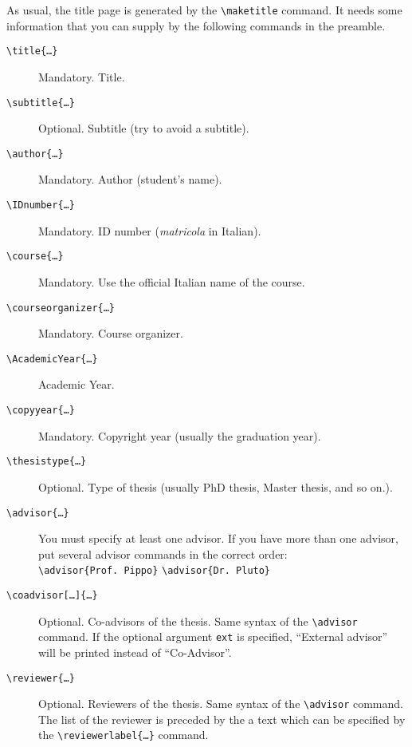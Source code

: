 \documentclass[a5paper,11pt]{article}
\newcommand{\bs}{\textbackslash}
\begin{document}
As usual, the title page is generated by the \texttt{\bs maketitle} command.
It needs some information that you can supply by the following commands
in the preamble.
\begin{description}
\item[\texttt{\bs title\{\dots\}}] Mandatory. Title.

\item[\texttt{\bs subtitle\{\dots\}}] Optional. Subtitle (try to avoid a subtitle).

\item[\texttt{\bs author\{\dots\}}] Mandatory. Author (student's name).

\item[\texttt{\bs IDnumber\{\dots\}}] Mandatory. ID number (\textit{matricola} in Italian).

\item[\texttt{\bs course\{\dots\}}] Mandatory. Use the official Italian name of the course.

\item[\texttt{\bs courseorganizer\{\dots\}}] Mandatory. Course organizer.

\item[\texttt{\bs AcademicYear\{\dots\}}] Academic Year.

\item[\texttt{\bs copyyear\{\dots\}}] Mandatory. Copyright year (usually the 
graduation year).

\item[\texttt{\bs thesistype\{\dots\}}] Optional. Type of thesis (usually PhD thesis, Master thesis, and so on.). 

\item[\texttt{\bs advisor\{\dots\}}] You must specify at least one advisor.
If you have more than one advisor, put several advisor commands in the correct order:\\
\texttt{\bs advisor\{Prof.~Pippo\}} \texttt{\bs advisor\{Dr.~Pluto\}}

\item[\texttt{\bs coadvisor[\dots]\{\dots\}}] Optional. Co-advisors of the thesis. 
Same syntax of the \texttt{\bs advisor} command. If the optional argument \texttt{ext} is specified, ``External advisor'' will be printed instead of ``Co-Advisor''.

\item[\texttt{\bs reviewer\{\dots\}}] Optional. Reviewers of the thesis. 
Same syntax of the \texttt{\bs advisor} command. The list of the reviewer is preceded by the a text which can be specified by the \texttt{\bs reviewerlabel\{\dots\}} command.


\end{description}
\end{document}
